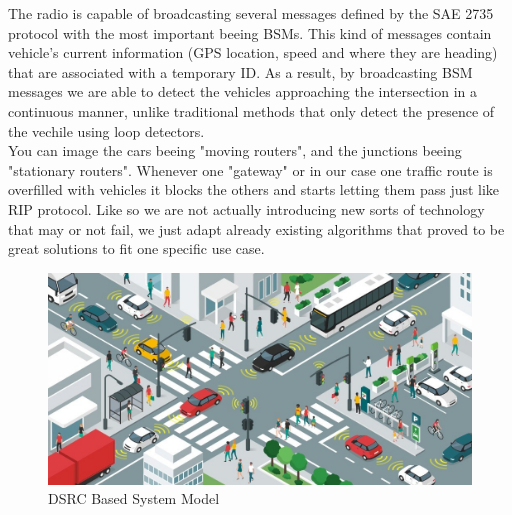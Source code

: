 \documentclass[17pt]{article}
\begin{document}
\indent \indent 
The radio is capable of broadcasting several messages defined by the SAE 2735
\cite{Kenney2011IOT} protocol with the most important beeing BSMs. This kind of 
messages contain vehicle's current information (GPS location, speed and where they
are heading) that are associated with a temporary ID. As a result, by broadcasting
BSM messages we are able to detect the vehicles approaching the intersection in a
continuous manner, unlike traditional methods that only detect the presence of the
vechile using loop detectors.\\
\indent \indent 
You can image the cars beeing "moving routers", and the junctions beeing
"stationary routers". Whenever one "gateway" or in our case one traffic route is
overfilled with vehicles it blocks the others and starts letting them pass just like
RIP protocol. Like so we are not actually introducing new sorts of technology that may
or not fail, we just adapt already existing algorithms that proved to be great
solutions to fit one specific use case.
\begin{figure}[h!]
    \includegraphics[width=\textwidth]{DSRCSystemModel.jpg}
    \caption{DSRC Based System Model \textcopyright}
    \label{fig:DSRCSystemModel}
\end{figure}\\
\end{document}
